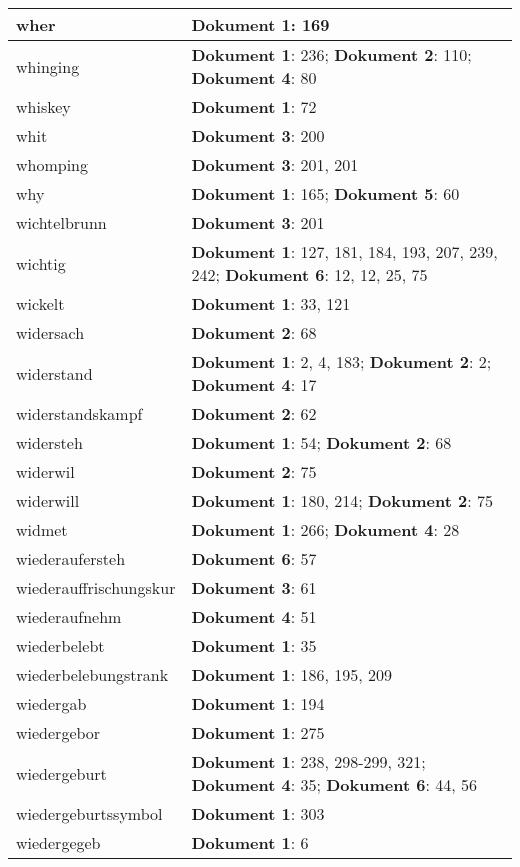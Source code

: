 \documentclass[a5paper]{article}
\begin{document}
\begin{longtable}[l]{|l|p{3in}|}
\hline
wher & \textbf{Dokument 1}: 169 \\
\hline
whinging & \textbf{Dokument 1}: 236; \textbf{Dokument 2}: 110; \textbf{Dokument 4}: 80 \\
\hline
whiskey & \textbf{Dokument 1}: 72 \\
\hline
whit & \textbf{Dokument 3}: 200 \\
\hline
whomping & \textbf{Dokument 3}: 201, 201 \\
\hline
why & \textbf{Dokument 1}: 165; \textbf{Dokument 5}: 60 \\
\hline
wichtelbrunn & \textbf{Dokument 3}: 201 \\
\hline
wichtig & \textbf{Dokument 1}: 127, 181, 184, 193, 207, 239, 242; \textbf{Dokument 6}: 12, 12, 25, 75 \\
\hline
wickelt & \textbf{Dokument 1}: 33, 121 \\
\hline
widersach & \textbf{Dokument 2}: 68 \\
\hline
widerstand & \textbf{Dokument 1}: 2, 4, 183; \textbf{Dokument 2}: 2; \textbf{Dokument 4}: 17 \\
\hline
widerstandskampf & \textbf{Dokument 2}: 62 \\
\hline
widersteh & \textbf{Dokument 1}: 54; \textbf{Dokument 2}: 68 \\
\hline
widerwil & \textbf{Dokument 2}: 75 \\
\hline
widerwill & \textbf{Dokument 1}: 180, 214; \textbf{Dokument 2}: 75 \\
\hline
widmet & \textbf{Dokument 1}: 266; \textbf{Dokument 4}: 28 \\
\hline
wiederaufersteh & \textbf{Dokument 6}: 57 \\
\hline
wiederauffrischungskur & \textbf{Dokument 3}: 61 \\
\hline
wiederaufnehm & \textbf{Dokument 4}: 51 \\
\hline
wiederbelebt & \textbf{Dokument 1}: 35 \\
\hline
wiederbelebungstrank & \textbf{Dokument 1}: 186, 195, 209 \\
\hline
wiedergab & \textbf{Dokument 1}: 194 \\
\hline
wiedergebor & \textbf{Dokument 1}: 275 \\
\hline
wiedergeburt & \textbf{Dokument 1}: 238, 298-299, 321; \textbf{Dokument 4}: 35; \textbf{Dokument 6}: 44, 56 \\
\hline
wiedergeburtssymbol & \textbf{Dokument 1}: 303 \\
\hline
wiedergegeb & \textbf{Dokument 1}: 6 \\

\end{longtable}
\end{document}
